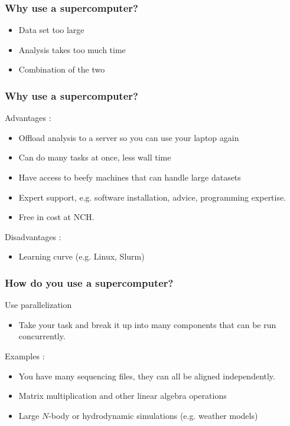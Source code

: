 \documentclass{beamer}
\begin{document}
\begin{frame}
\frametitle{Why use a supercomputer?}
\begin{itemize}
    \item Data set too large
    \bigskip
    \pause
    \item Analysis takes too much time
    \bigskip
    \pause
    \item Combination of the two
\end{itemize}
\end{frame}


\begin{frame}
\frametitle{Why use a supercomputer?}
Advantages :
\begin{itemize}
    \pause
    \item Offload analysis to a server so you can use your laptop again
    \medskip
    \pause
    \item Can do many tasks at once, less wall time
    \medskip
    \pause
    \item Have access to beefy machines that can handle large datasets
    \medskip
    \pause
    \item Expert support, e.g. software installation, advice, programming expertise.
    \medskip
    \pause
    \item Free in cost at NCH.
    \pause
\end{itemize}
\bigskip
Disadvantages :
\begin{itemize}
    \pause
    \item Learning curve (e.g. Linux, Slurm)
\end{itemize}
\end{frame}


\begin{frame}
\frametitle{How do you use a supercomputer?}
Use parallelization 
\pause
\begin{itemize}
    \item Take your task and break it up into many components that can be run concurrently.
\bigskip
\end{itemize}
\pause

Examples :
\pause
\begin{itemize}
    \item You have many sequencing files, they can all be aligned independently.
    \medskip
    \pause
    \item Matrix multiplication and other linear algebra operations   %
    \medskip
    \pause
    \item Large $N$-body or hydrodynamic simulations (e.g. weather models)      %
\end{itemize}
\end{frame}
\end{document}

